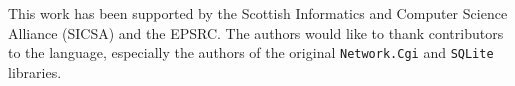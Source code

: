 \documentclass[preprint]{sigplanconf}
\begin{document}













\acks
This work has been supported by the Scottish Informatics and Computer Science Alliance (SICSA) and the EPSRC. The authors would like to thank contributors to the \idris{} language, especially the authors of the original \texttt{Network.Cgi} and \texttt{SQLite} libraries.






%
%
\end{document}
